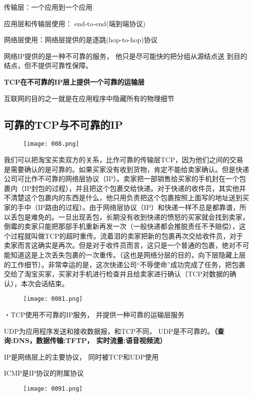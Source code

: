 \documentclass[cn,chinese,color=cyan]{elegantbook}
\begin{document}
传输层：一个应用到一个应用


应用层和传输层使用： end-to-end(端到端协议)

网络层使用：网络层提供的是逐跳(hop-to-hop)协议 

网络IP提供的是一种不可靠的服务， 他只是尽可能快的把分组从源结点送 到目的结点，但不提供可靠性保障。 

\textbf{TCP在不可靠的IP层上提供一个可靠的运输层} 

互联网的目的之一就是在应用程序中隐藏所有的物理细节


\subsection{可靠的TCP与不可靠的IP }
\begin{figure}[H]
	\centering
	\texttt{[image: 008.png]}
\end{figure}
我们可以把淘宝买卖双方的关系，比作可靠的传输层TCP，因为他们之间的交易是需要确认的是可靠的。如果买家没有收到货物，肯定不能给卖家确认。但是快递公司可比作不可靠的网络层协议（IP）。卖家把一部销售给买家的手机封在一个包裹内（IP封包的过程），并且把这个包裹交给快递。对于快递的收件员，其实他并不清楚这个包裹内的东西是什么，他只用负责把这个包裹按照上面写的地址送到买家的手中（IP路由的过程）。由于网络层协议（IP）和快递一样不总是都靠谱，所以丢包是难免的。一旦出现丢包，长期没有收到快递的愤怒的买家就会找到卖家，倒霉的卖家只能把那部手机重新再发一次（一般快递都会推脱责任不予赔偿），这个过程就叫做TCP的超时重传。流着泪的卖家把新的包裹再次交给收件员，对于卖家而言这确实是再次。但是对于收件员而言，这只是一个普通的包裹，绝对不可能知道这是上次丢失包裹的一次重传。（这也是网络分层的目的，向下层隐藏上层的工作细节）。非常幸运的是，这次快递公司“不辱使命”成功完成了任务，把包裹交给了淘宝买家，买家对手机进行检查并且给卖家进行确认（TCP对数据的确认），本次会话结束。

\begin{figure}[H]
	\centering
	\texttt{[image: 0081.png]}
\end{figure}
・TCP使用不可靠的IP服务， 并提供一种可靠的运输层服务 

UDP为应用程序发送和接收数据报，和TCP不同，
UDP是不可靠的。\textbf{（查 询:DNS，数据传输:TFTP， 实时流量:语音视频流）} 

IP是网络层上的主要协议， 同时被TCP和UDP使用

ICMP是IP协议的附属协议


\begin{figure}[H]
	\centering
	\texttt{[image: 0091.png]}
\end{figure}
\end{document}
